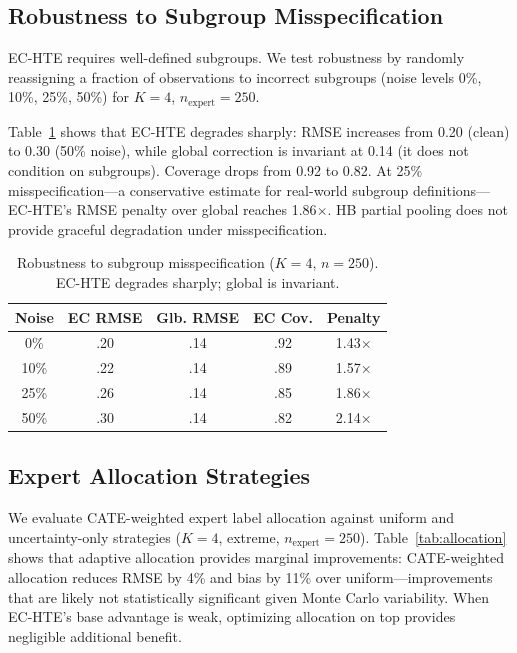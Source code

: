 \documentclass[11pt]{article}
\begin{document}
\subsection{Robustness to Subgroup Misspecification}
\label{sec:exp-robustness}

EC-HTE requires well-defined subgroups.
We test robustness by randomly reassigning a fraction of observations to incorrect subgroups (noise levels 0\%, 10\%, 25\%, 50\%) for $K{=}4$, $n_{\text{expert}}{=}250$.

Table~\ref{tab:robustness} shows that EC-HTE degrades sharply: RMSE increases from 0.20 (clean) to 0.30 (50\% noise), while global correction is invariant at 0.14 (it does not condition on subgroups).
Coverage drops from 0.92 to 0.82.
At 25\% misspecification---a conservative estimate for real-world subgroup definitions---EC-HTE's RMSE penalty over global reaches 1.86$\times$.
HB partial pooling does not provide graceful degradation under misspecification.

\begin{table}[t]
\centering
\small
\caption{Robustness to subgroup misspecification ($K{=}4$, $n{=}250$). EC-HTE degrades sharply; global is invariant.}
\label{tab:robustness}
\begin{tabular}{@{}ccccc@{}}
\toprule
Noise & EC RMSE & Glb. RMSE & EC Cov. & Penalty \\
\midrule
0\% & .20 & .14 & .92 & 1.43$\times$ \\
10\% & .22 & .14 & .89 & 1.57$\times$ \\
25\% & .26 & .14 & .85 & 1.86$\times$ \\
50\% & .30 & .14 & .82 & 2.14$\times$ \\
\bottomrule
\end{tabular}
\end{table}

\subsection{Expert Allocation Strategies}
\label{sec:exp-allocation}

We evaluate CATE-weighted expert label allocation against uniform and uncertainty-only strategies ($K{=}4$, extreme, $n_{\text{expert}}{=}250$).
Table~\ref{tab:allocation} shows that adaptive allocation provides marginal improvements: CATE-weighted allocation reduces RMSE by 4\% and bias by 11\% over uniform---improvements that are likely not statistically significant given Monte Carlo variability.
When EC-HTE's base advantage is weak, optimizing allocation on top provides negligible additional benefit.
\end{document}
